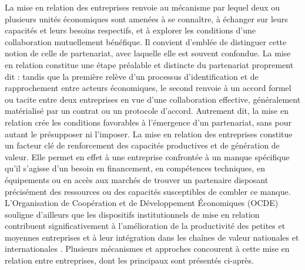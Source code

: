 \documentclass[12pt, a4paper, oneside]{report}
\begin{document}
La mise en relation des entreprises renvoie au mécanisme par lequel deux ou plusieurs unités économiques sont amenées à se connaître, à échanger sur leurs capacités et leurs besoins respectifs, et à explorer les conditions d'une collaboration mutuellement bénéfique. Il convient d'emblée de distinguer cette notion de celle de partenariat, avec laquelle elle est souvent confondue. La mise en relation constitue une étape préalable et distincte du partenariat proprement dit : tandis que la première relève d'un processus d'identification et de rapprochement entre acteurs économiques, le second renvoie à un accord formel ou tacite entre deux entreprises en vue d'une collaboration effective, généralement matérialisé par un contrat ou un protocole d'accord. Autrement dit, la mise en relation crée les conditions favorables à l'émergence d'un partenariat, sans pour autant le présupposer ni l'imposer. 
La mise en relation des entreprises constitue un facteur clé de renforcement des capacités productives et de génération de valeur. Elle permet en effet à une entreprise confrontée à un manque spécifique qu'il s'agisse d'un besoin en financement, en compétences techniques, en équipements ou en accès aux marchés de trouver un partenaire disposant précisément des ressources ou des capacités susceptibles de combler ce manque. L'Organisation de Coopération et de Développement Économiques (OCDE) souligne d'ailleurs que les dispositifs institutionnels de mise en relation contribuent significativement à l'amélioration de la productivité des petites et moyennes entreprises et à leur intégration dans les chaînes de valeur nationales et internationales \cite{ocde2021}. Plusieurs mécanismes et approches concourent à cette mise en relation entre entreprises, dont les principaux sont présentés ci-après.
	
\end{document}
